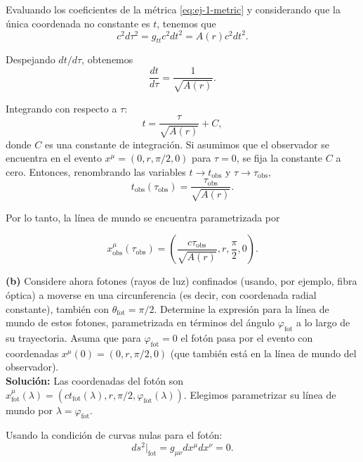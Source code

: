 \documentclass[letterpaper,11pt]{article}
\begin{document}
Evaluando los coeficientes de la métrica \eqref{eq:ej-1-metric} y considerando que la única coordenada no constante es $t$, tenemos que
\begin{equation}
c^2d\tau^2 = g_{tt} c^2dt^2 = A(r) c^2 dt^2.
\end{equation} 

Despejando $dt/d\tau$, obtenemos
\begin{equation}
\frac{dt}{d\tau} = \frac{1}{\sqrt{A(r)}} .
\end{equation}

Integrando con respecto a $\tau$:
\begin{equation}
t = \frac{\tau}{\sqrt{A(r)}} + C,
\end{equation}
donde $C$ es una constante de integración. Si asumimos que el observador se encuentra en el evento $x^{\mu} = (0,r,\pi/2,0)$ para $\tau = 0$, se fija la constante $C$ a cero. Entonces, renombrando las variables $t \to t_{\text{obs}}$ y $\tau \to \tau_{\text{obs}}$, 
\begin{equation}
t_{\text{obs}}(\tau_\text{obs}) = \frac{\tau_\text{obs}}{\sqrt{A(r)}}.
\end{equation}

Por lo tanto, la línea de mundo se encuentra parametrizada por
\begin{shaded}
\begin{equation}
x_{\text{obs}}^{\mu}(\tau_\text{obs}) = \left(\frac{c\tau_\text{obs}}{\sqrt{A(r)}},r,\frac{\pi}{2},0 \right). \label{eq:ej-1-a)}
\end{equation}
\end{shaded}

\textbf{(b)} Considere ahora fotones (rayos de luz) confinados (usando, por ejemplo, fibra óptica) a moverse en una circunferencia (es decir, con coordenada radial constante), también con $\theta_{\text{fot}} = \pi/2$. Determine la expresión para la línea de mundo de estos fotones, parametrizada en términos del ángulo $\varphi_{\text{fot}}$ a lo largo de su trayectoria. Asuma que para $\varphi_{\text{fot}} = 0$ el fotón pasa por el evento con coordenadas $x^{\mu}(0) = (0,r,\pi/2,0)$ (que también está en la línea de mundo del observador).
\\

\textbf{Solución:} Las coordenadas del fotón son $x_{\text{fot}}^{\mu}(\lambda) = (ct_{\text{fot}}(\lambda),r,\pi/2,\varphi_{\text{fot}}(\lambda))$. Elegimos parametrizar su línea de mundo por $\lambda = \varphi_{\text{fot}}$. 

Usando la condición de curvas nulas para el fotón:
\begin{equation}
ds^2|_{\text{fot}} = g_{\mu\nu} dx^{\mu}dx^{\nu} = 0.
\end{equation}
\end{document}

